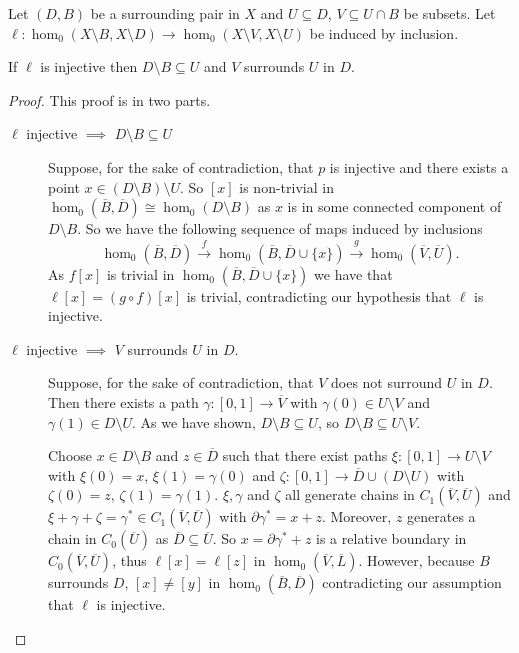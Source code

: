 \begin{lemma}\label{lem:coverage}
  Let $(D, B)$ be a surrounding pair in $X$ and $U\subseteq D$, $V\subseteq U\cap B$ be subsets.
  Let $\ell: \hom_0(X\setminus B, X\setminus D)\to \hom_0(X\setminus V, X\setminus U)$ be induced by inclusion.

  If $\ell$ is injective then $D\setminus B\subseteq U$ and $V$ surrounds $U$ in $D$.
\end{lemma}
\begin{proof}
  This proof is in two parts.
  \begin{description}
    \item[$\ell$ injective $\implies$ $D\setminus B\subseteq U$] Suppose, for the sake of contradiction, that $p$ is injective and there exists a point $x\in (D\setminus B)\setminus U$.
      So $[x]$ is non-trivial in $\hom_0(\overline{B},\overline{D})\cong \hom_0(D\setminus B)$ as $x$ is in some connected component of $D\setminus B$.
      So we have the following sequence of maps induced by inclusions
      \[ \hom_0(\overline{B},\overline{D})\xrightarrow{f} \hom_0(\overline{B},\overline{D}\cup\{x\})\xrightarrow{g} \hom_0(\overline{V},\overline{U}).\]
      As $f[x]$ is trivial in $\hom_0(\overline{B},\overline{D}\cup\{x\})$ we have that $\ell[x] = (g\circ f)[x]$ is trivial, contradicting our hypothesis that $\ell$ is injective.
    \item[$\ell$ injective $\implies$ $V$ surrounds $U$ in $D$.] Suppose, for the sake of contradiction, that $V$ does not surround $U$ in $D$.
      Then there exists a path $\gamma : [0,1]\to\overline{V}$ with $\gamma(0)\in U\setminus V$ and $\gamma(1)\in D\setminus U$.
      As we have shown, $D\setminus B\subseteq U$, so $D\setminus B\subseteq U\setminus V$.

      Choose $x\in D\setminus B$ and $z\in \overline{D}$ such that there exist paths $\xi : [0,1]\to U\setminus V$ with $\xi(0) = x$, $\xi(1) = \gamma(0)$ and $\zeta : [0,1]\to \overline{D}\cup (D\setminus U)$ with $\zeta(0) = z$, $\zeta(1) = \gamma(1)$.
      $\xi, \gamma$ and $\zeta$ all generate chains in $C_1(\overline{V}, \overline{U})$ and $\xi + \gamma + \zeta = \gamma^*\in C_1(\overline{V}, \overline{U})$ with $\partial\gamma^* = x + z$.
      Moreover, $z$ generates a chain in $C_0(\overline{U})$ as $\overline{D}\subseteq\overline{U}$.
      So $x = \partial\gamma^* + z$ is a relative boundary in $C_0(\overline{V}, \overline{U})$, thus $\ell[x] = \ell[z]$ in $\hom_0(\overline{V}, \overline{L})$.
      However, because $B$ surrounds $D$, $[x]\neq [y]$ in $\hom_0(\overline{B}, \overline{D})$ contradicting our assumption that $\ell$ is injective.
  \end{description}
\end{proof}

